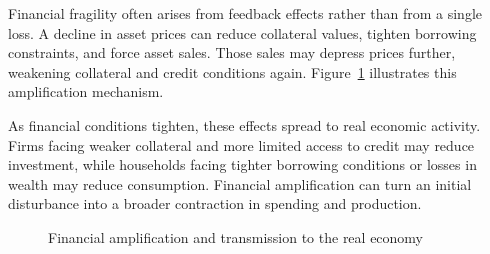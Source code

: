 Financial fragility often arises from feedback effects rather than from a single loss. A decline in asset prices can reduce collateral values, tighten borrowing constraints, and force asset sales. Those sales may depress prices further, weakening collateral and credit conditions again. Figure~\ref {fig:ch1-fragility-loop} illustrates this amplification mechanism.

As financial conditions tighten, these effects spread to real economic activity. Firms facing weaker collateral and more limited access to credit may reduce investment, while households facing tighter borrowing conditions or losses in wealth may reduce consumption. Financial amplification can turn an initial disturbance into a broader contraction in spending and production.

\begin{figure}[H]
\centering
{}

\caption{Financial amplification and transmission to the real economy}
\label{fig:ch1-fragility-loop}
\end{figure}


